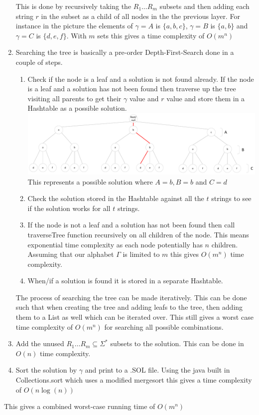 \documentclass[paper=a4, fontsize=11pt]{scrartcl}
\numberwithin{equation}{section}		%
\numberwithin{figure}{section}			%
\numberwithin{table}{section}				%
\begin{document}
\begin{enumerate}
This is done by recursively taking the $R_1\ldots R_m$ subsets and then adding each string $r$ in the subset as a child of all nodes in the the previous layer. For instance in the picture the elements of $\gamma =A$ is $\{a,b,c\}$, $\gamma =B$ is $\{a,b\}$ and $\gamma =C$ is $\{d,e,f\}$. With $m$ sets this gives a time complexity of $O(m^n)$
\item
Searching the tree is basically a pre-order Depth-First-Search done in a couple of steps.
\begin{enumerate}
\item
Check if the node is a leaf and a solution is not found already. If the node is a leaf and a solution has not been found then traverse up the tree visiting all parents to get their $\gamma$ value and $r$ value and store them in a Hashtable as a possible solution.
\includegraphics[width=1\textwidth]{TreePossibleSol.pdf}
This represents a possible solution where $A=b, B=b$ and $C=d$
\item
Check the solution stored in the Hashtable against all the $t$ strings to see if the solution works for all $t$ strings.
\item
If the node is not a leaf and a solution has not been found then call traverseTree function recursively on all children of the node. This means exponential time complexity as each node potentially has $n$ children. Assuming that our alphabet $\Gamma$ is limited to $m$ this gives $O(m^n)$ time complexity.
\item
When/if a solution is found it is stored in a separate Hashtable.
\end{enumerate}
The process of searching the tree can be made iteratively. This can be done such that when creating the tree and adding leafs to the tree, then adding them to a List as well which can be iterated over. This still gives a worst case time complexity of $O(m^n)$ for searching all possible combinations.
\item
Add the unused $R_1\ldots R_m \subseteq \Sigma^*$ subsets to the solution. This can be done in $O(n)$ time complexity.
\item
Sort the solution by $\gamma$ and print to a .SOL file. Using the java built in Collections.sort which uses a modified mergesort this gives a time complexity of $O(n \log(n))$ 
\end{enumerate}
This gives a combined worst-case running time of $O(m^n)$
\end{document}
